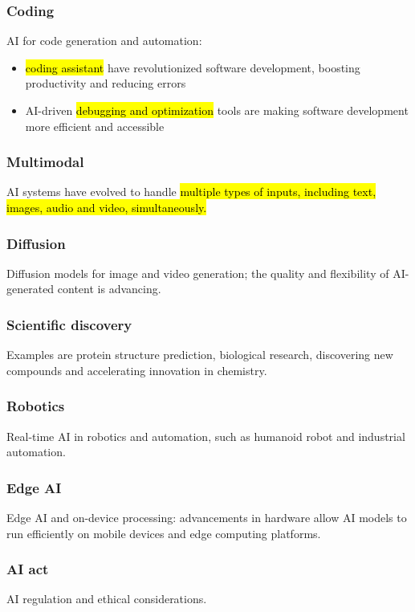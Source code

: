 \subsubsection{Coding}
AI for code generation and automation:
\begin{itemize}
    \item \hl{coding assistant} have revolutionized software development, boosting productivity 
    and reducing errors 
    \item AI-driven \hl{debugging and optimization} tools are making software development more efficient and accessible
\end{itemize}

\subsubsection{Multimodal}
AI systems have evolved to handle \hl{multiple types of inputs, including text, images, 
audio and video, simultaneously.}

\subsubsection{Diffusion}
Diffusion models for image and video generation; the quality and flexibility of 
AI-generated content is advancing.

\subsubsection{Scientific discovery}
Examples are protein structure prediction, biological research, discovering new 
compounds and accelerating innovation in chemistry.

\subsubsection{Robotics}
Real-time AI in robotics and automation, such as humanoid robot and industrial 
automation.

\subsubsection{Edge AI}
Edge AI and on-device processing: advancements in hardware allow AI models to run 
efficiently on mobile devices and edge computing platforms.

\subsubsection{AI act}
AI regulation and ethical considerations.


